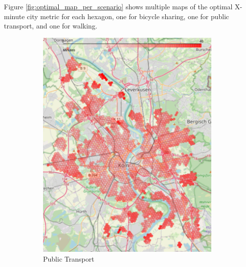 Figure \ref{fig:optimal_map_per_scenario} shows multiple maps of the optimal X-minute city metric for each hexagon, one for bicycle sharing, one for public transport, and one for walking.
\begin{figure}
     \centering
     \begin{subfigure}[b]{0.3\textwidth}
         \centering
         \includegraphics[width=\textwidth]{Figures/results/minute_city_metric/public_transport_optimal_map}
         \caption{Public Transport}
         \label{fig:public_transport_optimal_map}
     \end{subfigure}
     \hfill
     \begin{subfigure}[b]{0.3\textwidth}
         \centering

\end{subfigure}
\end{figure}
